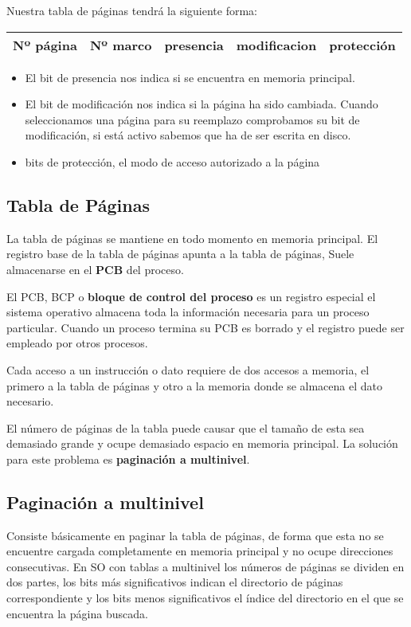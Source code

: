Nuestra tabla de páginas tendrá la siguiente forma:

\begin{tabular}{| c | c | c | c | c |}
	\hline
	Nº página & Nº marco & presencia & modificacion & protección \\
	\hline
\end{tabular}

\begin{itemize}
	\item El bit de presencia nos indica si se encuentra en memoria principal.
	\item El bit de modificación nos indica si la página ha sido cambiada. Cuando seleccionamos una página para su reemplazo comprobamos su bit de modificación, si está activo sabemos que ha de ser escrita en disco.
	\item bits de protección, el modo de acceso autorizado a la página
\end{itemize}

\subsection*{Tabla de Páginas}
La tabla de páginas se mantiene en todo momento en memoria principal. El registro base de la tabla de páginas apunta a la tabla de páginas, Suele almacenarse en el \textbf{PCB} del proceso.

El PCB, BCP o \textbf{bloque de control del proceso} es un registro especial el sistema operativo almacena toda la información necesaria para un proceso particular. Cuando un proceso termina su PCB es borrado y el registro puede ser empleado por otros procesos.

Cada acceso a un instrucción o dato requiere de dos accesos a memoria, el primero a la tabla de páginas y otro a la memoria donde se almacena el dato necesario.

El número de páginas de la tabla puede causar que el tamaño de esta sea demasiado grande y ocupe demasiado espacio en memoria principal. La solución para este problema es \textbf{paginación a multinivel}.

\subsection*{Paginación a multinivel}
Consiste básicamente en paginar la tabla de páginas, de forma que esta no se encuentre cargada completamente en memoria principal y no ocupe direcciones consecutivas. En SO con tablas a multinivel los números de páginas se dividen en dos partes, los bits más significativos indican el directorio de páginas correspondiente y los bits menos significativos el índice del directorio en el que se encuentra la página buscada.

